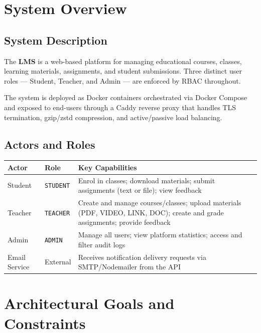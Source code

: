 \documentclass[12pt,a4paper]{article}
\begin{document}
\section{System Overview}

\subsection{System Description}

The \textbf{LMS} is a web-based platform for managing educational courses, classes, learning
materials, assignments, and student submissions. Three distinct user roles ---
Student, Teacher, and Admin --- are enforced by RBAC throughout.

The system is deployed as Docker containers orchestrated via Docker Compose and exposed to
end-users through a Caddy reverse proxy that handles TLS termination, gzip/zstd compression,
and active/passive load balancing.

\subsection{Actors and Roles}

\begin{tabularx}{\textwidth}{L{2.2cm} L{1.8cm} L{9.5cm}}
  \toprule
  \textbf{Actor} & \textbf{Role} & \textbf{Key Capabilities} \\
  \midrule
  Student & \texttt{STUDENT} & Enrol in classes; download materials; submit assignments (text or file); view feedback \\
  Teacher & \texttt{TEACHER} & Create and manage courses/classes; upload materials (PDF, VIDEO, LINK, DOC); create and grade assignments; provide feedback \\
  Admin   & \texttt{ADMIN}   & Manage all users; view platform statistics; access and filter audit logs \\
  Email Service & External & Receives notification delivery requests via SMTP/Nodemailer from the API \\
  \bottomrule
\end{tabularx}

\section{Architectural Goals and Constraints}
\label{sec:goals}
\end{document}
